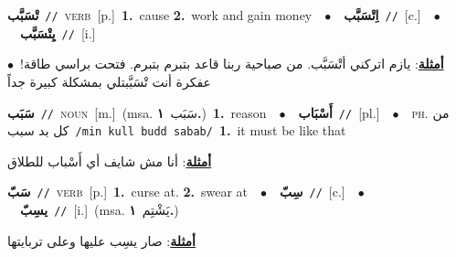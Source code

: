 \documentclass[10pt,a4paper,twoside]{article} %
\begin{document}
\begin{multicols}{2}
{\setlength\topsep{0pt}\textbf{\foreignlanguage{arabic}{تْسَبَّب}}\ {\color{gray}\texttt{//}\color{black}}\ \textsc{verb}\ [p.]\ \textbf{1.}~cause  \textbf{2.}~work and gain money\ \ $\bullet$\ \ \setlength\topsep{0pt}\textbf{\foreignlanguage{arabic}{اِتْسَبَّب}}\ {\color{gray}\texttt{//}\color{black}}\ [c.]\ \ $\bullet$\ \ \setlength\topsep{0pt}\textbf{\foreignlanguage{arabic}{يِتْسَبَّب}}\ {\color{gray}\texttt{//}\color{black}}\ [i.]\  \begin{flushright}\color{gray}\foreignlanguage{arabic}{\textbf{\underline{\foreignlanguage{arabic}{أمثلة}}}: يازم اتركني أتْسَبَّب. من صباحية ربنا قاعد بتبرم بتبرم. فتحت براسي طاقة!\ $\bullet$\ \  عفكرة أنت تْسَبَّبتلي بمشكلة كبيرة جداً}\end{flushright}\color{black}} \vspace{2mm}

{\setlength\topsep{0pt}\textbf{\foreignlanguage{arabic}{سَبَب}}\ {\color{gray}\texttt{//}\color{black}}\ \textsc{noun}\ [m.]\ \color{gray}(msa. \foreignlanguage{arabic}{سَبَب}~\foreignlanguage{arabic}{\textbf{١.}})\color{black}\ \textbf{1.}~reason\ \ $\bullet$\ \ \setlength\topsep{0pt}\textbf{\foreignlanguage{arabic}{أَسْبَاب}}\ {\color{gray}\texttt{//}\color{black}}\ [pl.]\ \ $\bullet$\ \ \textsc{ph.} \color{gray} \foreignlanguage{arabic}{من كل بد سبب}\color{black}\ {\color{gray}\texttt{/{\sffamily min kull budd sabab}/}\color{black}}\ \textbf{1.}~it must be like that\  \begin{flushright}\color{gray}\foreignlanguage{arabic}{\textbf{\underline{\foreignlanguage{arabic}{أمثلة}}}: أنا مش شايف أي أَسْباب للطلاق}\end{flushright}\color{black}} \vspace{2mm}

{\setlength\topsep{0pt}\textbf{\foreignlanguage{arabic}{سَبّ}}\ {\color{gray}\texttt{//}\color{black}}\ \textsc{verb}\ [p.]\ \textbf{1.}~curse at.  \textbf{2.}~swear at\ \ $\bullet$\ \ \setlength\topsep{0pt}\textbf{\foreignlanguage{arabic}{سِبّ}}\ {\color{gray}\texttt{//}\color{black}}\ [c.]\ \ $\bullet$\ \ \setlength\topsep{0pt}\textbf{\foreignlanguage{arabic}{يسِبّ}}\ {\color{gray}\texttt{//}\color{black}}\ [i.]\ \color{gray}(msa. \foreignlanguage{arabic}{يَشْتِم}~\foreignlanguage{arabic}{\textbf{١.}})\color{black}\  \begin{flushright}\color{gray}\foreignlanguage{arabic}{\textbf{\underline{\foreignlanguage{arabic}{أمثلة}}}: صار يسِب عليها وعلى تربايتها}\end{flushright}\color{black}} \vspace{2mm}


\end{multicols}
\end{document}
